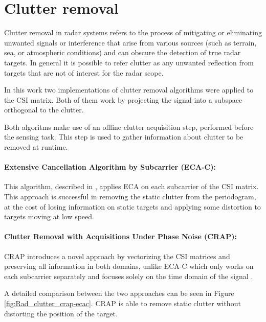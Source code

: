 \section{Clutter removal}
\label{sec:clutter_removal}

	Clutter removal in radar systems refers to the process of mitigating or eliminating unwanted signals or interference that arise from various sources (such as terrain, sea, or atmospheric conditions) and can obscure the detection of true radar targets.
	In general it is possible to refer clutter as any unwanted reflection from targets that are not of interest for the radar scope.
	
	In this work two implementations of clutter removal algorithms were applied to the CSI matrix.
	Both of them work by projecting the signal into a subspace orthogonal to the clutter.
	
	Both algoritms make use of an offline clutter acquisition step, performed before the sensing task. This step is used to gather information about clutter to be removed at runtime.
	
	\paragraph{Extensive Cancellation Algorithm by Subcarrier (ECA-C):}
	This algorithm, described in \cite{Wan_Cheng_Gong_Zhao_Shao_2012}, applies ECA \cite{Colone_ECA_2009} on each subcarrier of the CSI matrix.
	This approach is successful in removing the static clutter from the periodogram, at the cost of losing information on static targets and applying some distortion to targets moving at low speed.
	
	
	\paragraph{Clutter Removal with Acquisitions Under Phase Noise (CRAP):}
	CRAP introduces a novel approach by vectorizing the CSI matrices and preserving all information in both domains, unlike ECA-C which only works on each subcarrier separately and focuses solely on the time domain of the signal \cite{Henninger_CRAP_2023}.
	
	A detailed comparison between the two approaches can be seen in Figure \ref{fig:Rad_clutter_crap-ecac}. CRAP is able to remove static clutter without distorting the position of the target.

